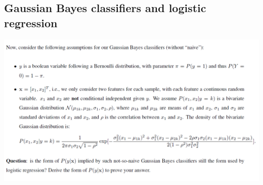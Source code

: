 \documentclass[UTF8,12pt, a4paper]{ctexart}
\begin{document}
\subsection{Gaussian Bayes classifiers and logistic regression}
\includegraphics[scale=0.9]{question3.png} \\
\end{document}
